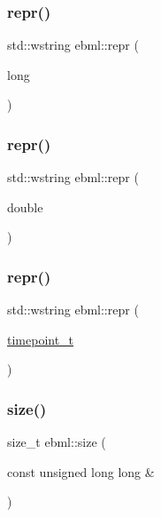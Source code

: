 \mbox{\label{namespaceebml_ace4ca5a87203afac26054d724b9be07d}} 
\subsubsection{\texorpdfstring{repr()}{repr()}\hspace{0.1cm}{\footnotesize\ttfamily [8/10]}}
{\footnotesize\ttfamily std\+::wstring ebml\+::repr (\begin{DoxyParamCaption}\item[{long}]{ }\end{DoxyParamCaption})}

\mbox{\label{namespaceebml_a2798ab93b716158ab4c4e796f7c9c97c}} 
\subsubsection{\texorpdfstring{repr()}{repr()}\hspace{0.1cm}{\footnotesize\ttfamily [9/10]}}
{\footnotesize\ttfamily std\+::wstring ebml\+::repr (\begin{DoxyParamCaption}\item[{double}]{ }\end{DoxyParamCaption})}

\mbox{\label{namespaceebml_a92c6b0cf4a3eef6a4b48746c0e43a3c1}} 
\subsubsection{\texorpdfstring{repr()}{repr()}\hspace{0.1cm}{\footnotesize\ttfamily [10/10]}}
{\footnotesize\ttfamily std\+::wstring ebml\+::repr (\begin{DoxyParamCaption}\item[{\mbox{\hyperlink{namespaceebml_a7e667ec3fe8b51fb5b8f9690734d8638}{timepoint\+\_\+t}}}]{ }\end{DoxyParamCaption})}

\mbox{\label{namespaceebml_a6e2cf9e4800e8a09b5f4cb8de613ad77}} 
\subsubsection{\texorpdfstring{size()}{size()}\hspace{0.1cm}{\footnotesize\ttfamily [1/6]}}
{\footnotesize\ttfamily size\+\_\+t ebml\+::size (\begin{DoxyParamCaption}\item[{const unsigned long long \&}]{ }\end{DoxyParamCaption})}

